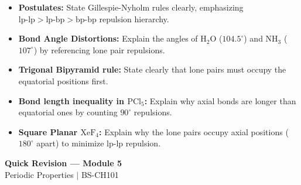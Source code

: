 \documentclass[12pt,a4paper]{article}
\begin{document}
\begin{tcolorbox}[exambox, title={Exam Points: VSEPR and Shapes}]
  \begin{itemize}[leftmargin=*, itemsep=2pt, topsep=2pt]
    \item \textbf{Postulates:} State Gillespie-Nyholm rules clearly, emphasizing $\text{lp-lp} > \text{lp-bp} > \text{bp-bp}$ repulsion hierarchy.
    \item \textbf{Bond Angle Distortions:} Explain the angles of $\text{H}_2\text{O}$ ($104.5^\circ$) and $\text{NH}_3$ ($107^\circ$) by referencing lone pair repulsions.
    \item \textbf{Trigonal Bipyramid rule:} State clearly that lone pairs must occupy the equatorial positions first.
    \item \textbf{Bond length inequality in $\text{PCl}_5$:} Explain why axial bonds are longer than equatorial ones by counting $90^\circ$ repulsions.
    \item \textbf{Square Planar $\text{XeF}_4$:} Explain why the lone pairs occupy axial positions ($180^\circ$ apart) to minimize lp-lp repulsion.
  \end{itemize}
\end{tcolorbox}

\newpage
\begin{center}
  {\large\bfseries\color{myred} Quick Revision --- Module 5}\\[3pt]
  {\small\color{mydark} Periodic Properties $|$ BS-CH101}
\end{center}
\noindent{\color{myred}\rule{\linewidth}{1.2pt}}
\vspace{4pt}
\end{document}
